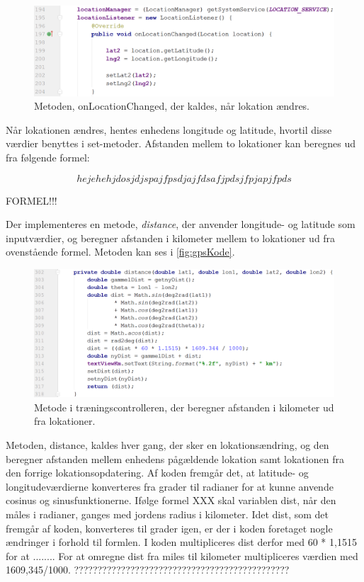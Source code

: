 \begin{figure} [H]
\centering
\includegraphics[width=1\textwidth]{figures/imple/gpsKode}
\caption{Metoden, onLocationChanged, der kaldes, når lokation ændres.}
\label{fig:gpsKode}
\end{figure} 

Når lokationen ændres, hentes enhedens longitude og latitude, hvortil disse værdier benyttes i set-metoder. Afstanden mellem to lokationer kan beregnes ud fra følgende formel:

\begin{equation} \label{equ:GPS}
hejehehjdosjdjspajfpsdjajfdsafjpdsjfpjapjfpds
\end{equation}

FORMEL!!!


Der implementeres en metode, \textit{distance}, der anvender longitude- og latitude som inputværdier, og beregner afstanden i kilometer mellem to lokationer ud fra ovenstående formel. Metoden kan ses i \autoref{fig:gpsKode}.

\begin{figure} [H]
\centering
\includegraphics[width=1\textwidth]{figures/imple/distanceKode}
\caption{Metode i træningscontrolleren, der beregner afstanden i kilometer ud fra lokationer.}
\label{fig:disanceKode}
\end{figure} 

Metoden, distance, kaldes hver gang, der sker en lokationsændring, og den beregner afstanden mellem enhedens pågældende lokation samt lokationen fra den forrige lokationsopdatering. Af koden fremgår det, at latitude- og longitudeværdierne konverteres fra grader til radianer for at kunne anvende cosinus og sinusfunktionerne. Ifølge formel XXX skal variablen dist, når den måles i radianer, ganges med jordens radius i kilometer. Idet dist, som det fremgår af koden, konverteres til grader igen, er der i koden foretaget nogle ændringer i forhold til formlen. I koden multipliceres dist derfor med 60 * 1,1515 for at ........ For at omregne dist fra miles til kilometer multipliceres værdien med 1609,345/1000. ??????????????????????????????????????????????

